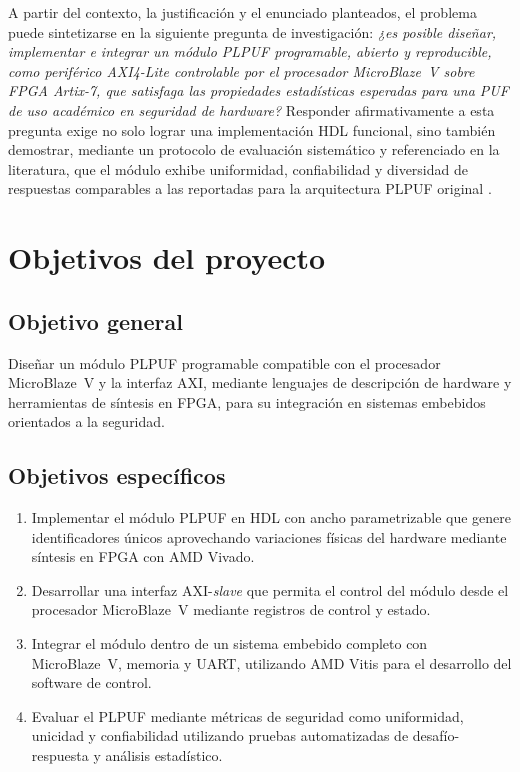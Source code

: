 A partir del contexto, la justificación y el enunciado planteados, el problema
puede sintetizarse en la siguiente pregunta de investigación: \textit{¿es
posible diseñar, implementar e integrar un módulo PLPUF programable, abierto
y reproducible, como periférico AXI4-Lite controlable por el procesador
MicroBlaze~V sobre FPGA Artix-7, que satisfaga las propiedades estadísticas
esperadas para una PUF de uso académico en seguridad de hardware?} Responder
afirmativamente a esta pregunta exige no solo lograr una implementación HDL
funcional, sino también demostrar, mediante un protocolo de evaluación
sistemático y referenciado en la literatura, que el módulo exhibe
uniformidad, confiabilidad y diversidad de respuestas comparables a las
reportadas para la arquitectura PLPUF original
\cite{hori_2011_pseudolfsr, maiti_2012_systematic}.


\section{Objetivos del proyecto}

\subsection{Objetivo general}

Diseñar un módulo PLPUF programable compatible con el procesador MicroBlaze~V y la
interfaz AXI, mediante lenguajes de descripción de hardware y herramientas de síntesis
en FPGA, para su integración en sistemas embebidos orientados a la seguridad.

\subsection{Objetivos específicos}

\begin{enumerate}
\item Implementar el módulo PLPUF en HDL con ancho parametrizable que genere
identificadores únicos aprovechando variaciones físicas del hardware mediante
síntesis en FPGA con AMD Vivado.

\item Desarrollar una interfaz AXI-\textit{slave} que permita el control del módulo
desde el procesador MicroBlaze~V mediante registros de control y estado.

\item Integrar el módulo dentro de un sistema embebido completo con MicroBlaze~V,
memoria y UART, utilizando AMD Vitis para el desarrollo del software de control.

\item Evaluar el PLPUF mediante métricas de seguridad como uniformidad, unicidad y
confiabilidad utilizando pruebas automatizadas de desafío-respuesta y análisis
estadístico.
\end{enumerate}


